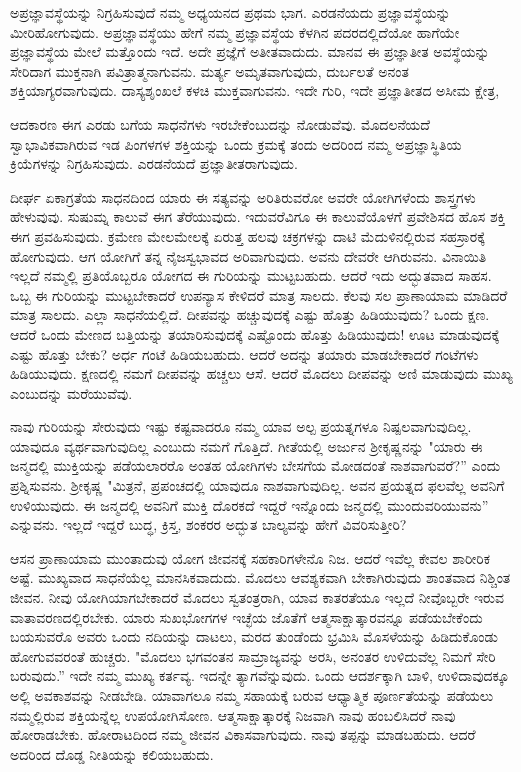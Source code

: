 ಅಪ್ರಜ್ಞಾವಸ್ಥೆಯನ್ನು ನಿಗ್ರಹಿಸುವುದೆ ನಮ್ಮ ಅಧ್ಯಯನದ ಪ್ರಥಮ ಭಾಗ. ಎರಡನೆಯದು ಪ್ರಜ್ಞಾವಸ್ಥೆಯನ್ನು ಮೀರಿಹೋಗುವುದು. ಅಪ್ರಜ್ಞಾವಸ್ಥೆಯು ಹೇಗೆ ನಮ್ಮ ಪ್ರಜ್ಞಾವಸ್ಥೆಯ ಕೆಳಗಿನ ಪದರದಲ್ಲಿದೆಯೋ ಹಾಗೆಯೇ ಪ್ರಜ್ಞಾವಸ್ಥೆಯ ಮೇಲೆ ಮತ್ತೊಂದು ಇದೆ. ಅದೇ ಪ್ರಜ್ಞೆಗೆ ಅತೀತವಾದುದು. ಮಾನವ ಈ ಪ್ರಜ್ಞಾತೀತ ಅವಸ್ಥೆಯನ್ನು ಸೇರಿದಾಗ ಮುಕ್ತನಾಗಿ ಪವಿತ್ರಾತ್ಮನಾಗುವನು. ಮರ್ತ್ಯ ಅಮೃತವಾಗುವುದು, ದುರ್ಬಲತೆ ಅನಂತ ಶಕ್ತಿಯಾಗ್ಯರವಾಗುವುದು. ದಾಸ್ಯಶೃಂಖಲೆ ಕಳಚಿ ಮುಕ್ತವಾಗುವನು. ಇದೇ ಗುರಿ, ಇದೇ ಪ್ರಜ್ಞಾತೀತದ ಅಸೀಮ ಕ್ಷೇತ್ರ,

ಆದಕಾರಣ ಈಗ ಎರಡು ಬಗೆಯ ಸಾಧನೆಗಳು ಇರಬೇಕೆಂಬುದನ್ನು ನೋಡುವೆವು. ಮೊದಲನೆಯದೆ ಸ್ವಾಭಾವಿಕವಾಗಿರುವ ಇಡ ಪಿಂಗಳಗಳ ಶಕ್ತಿಯನ್ನು ಒಂದು ಕ್ರಮಕ್ಕೆ ತಂದು ಅದರಿಂದ ನಮ್ಮ ಅಪ್ರಜ್ಞಾಸ್ಥಿತಿಯ ಕ್ರಿಯೆಗಳನ್ನು ನಿಗ್ರಹಿಸುವುದು. ಎರಡನೆಯದೆ ಪ್ರಜ್ಞಾತೀತರಾಗುವುದು.

ದೀರ್ಘ ಏಕಾಗ್ರತೆಯ ಸಾಧನದಿಂದ ಯಾರು ಈ ಸತ್ಯವನ್ನು ಅರಿತಿರುವರೋ ಅವರೇ ಯೋಗಿಗಳೆಂದು ಶಾಸ್ತ್ರಗಳು ಹೇಳುವುವು. ಸುಷುಮ್ನ ಕಾಲುವೆ ಈಗ ತೆರೆಯುವುದು. ಇದುವರೆವಿಗೂ ಈ ಕಾಲುವೆಯೊಳಗೆ ಪ್ರವೇಶಿಸದ ಹೊಸ ಶಕ್ತಿ ಈಗ ಪ್ರವಹಿಸುವುದು. ಕ್ರಮೇಣ ಮೇಲಮೇಲಕ್ಕೆ ಏರುತ್ತ ಹಲವು ಚಕ್ರಗಳನ್ನು ದಾಟಿ ಮೆದುಳಿನಲ್ಲಿರುವ ಸಹಸ್ರಾರಕ್ಕೆ ಹೋಗುವುದು. ಆಗ ಯೋಗಿಗೆ ತನ್ನ ನೈಜಸ್ವಭಾವದ ಅರಿವಾಗುವುದು. ಅವನು ದೇವರೇ ಆಗಿರುವನು. ವಿನಾಯಿತಿ ಇಲ್ಲದೆ ನಮ್ಮಲ್ಲಿ ಪ್ರತಿಯೊಬ್ಬರೂ ಯೋಗದ ಈ ಗುರಿಯನ್ನು ಮುಟ್ಟಬಹುದು. ಆದರೆ ಇದು ಅದ್ಭುತವಾದ ಸಾಹಸ. ಒಬ್ಬ ಈ ಗುರಿಯನ್ನು ಮುಟ್ಟಬೇಕಾದರೆ ಉಪನ್ಯಾಸ ಕೇಳಿದರೆ ಮಾತ್ರ ಸಾಲದು. ಕೆಲವು ಸಲ ಪ್ರಾಣಾಯಾಮ ಮಾಡಿದರೆ ಮಾತ್ರ ಸಾಲದು. ಎಲ್ಲಾ ಸಾಧನೆಯಲ್ಲಿದೆ. ದೀಪವನ್ನು ಹಚ್ಚುವುದಕ್ಕೆ ಎಷ್ಟು ಹೊತ್ತು ಹಿಡಿಯುವುದು? ಒಂದು ಕ್ಷಣ. ಆದರೆ ಒಂದು ಮೇಣದ ಬತ್ತಿಯನ್ನು ತಯಾರಿಸುವುದಕ್ಕೆ ಎಷ್ಟೊಂದು ಹೊತ್ತು ಹಿಡಿಯುವುದು! ಊಟ ಮಾಡುವುದಕ್ಕೆ ಎಷ್ಟು ಹೊತ್ತು ಬೇಕು? ಅರ್ಧ ಗಂಟೆ ಹಿಡಿಯಬಹುದು. ಆದರೆ ಅದನ್ನು ತಯಾರು ಮಾಡಬೇಕಾದರೆ ಗಂಟೆಗಳು ಹಿಡಿಯುವುದು. ಕ್ಷಣದಲ್ಲಿ ನಮಗೆ ದೀಪವನ್ನು ಹಚ್ಚಲು ಆಸೆ. ಆದರೆ ಮೊದಲು ದೀಪವನ್ನು ಅಣಿ ಮಾಡುವುದು ಮುಖ್ಯ ಎಂಬುದನ್ನು ಮರೆಯುವೆವು.

ನಾವು ಗುರಿಯನ್ನು ಸೇರುವುದು ಇಷ್ಟು ಕಷ್ಟವಾದರೂ ನಮ್ಮ ಯಾವ ಅಲ್ಪ ಪ್ರಯತ್ನಗಳೂ ನಿಷ್ಪಲವಾಗುವುದಿಲ್ಲ. ಯಾವುದೂ ವ್ಯರ್ಥವಾಗುವುದಿಲ್ಲ ಎಂಬುದು ನಮಗೆ ಗೊತ್ತಿದೆ. ಗೀತೆಯಲ್ಲಿ ಅರ್ಜುನ ಶ‍್ರೀಕೃಷ್ಣನನ್ನು "ಯಾರು ಈ ಜನ್ಮದಲ್ಲಿ ಮುಕ್ತಿಯನ್ನು ಪಡೆಯಲಾರರೊ ಅಂತಹ ಯೋಗಿಗಳು ಬೇಸಗೆಯ ಮೋಡದಂತೆ ನಾಶವಾಗುವರೆ?'' ಎಂದು ಪ್ರಶ್ನಿಸುವನು. ಶ‍್ರೀಕೃಷ್ಣ "ಮಿತ್ರನೆ, ಪ್ರಪಂಚದಲ್ಲಿ ಯಾವುದೂ ನಾಶವಾಗುವುದಿಲ್ಲ. ಅವನ ಪ್ರಯತ್ನದ ಫಲವೆಲ್ಲ ಅವನಿಗೆ ಉಳಿಯುವುದು. ಈ ಜನ್ಮದಲ್ಲಿ ಅವನಿಗೆ ಮುಕ್ತಿ ದೊರಕದೆ ಇದ್ದರೆ ಇನ್ನೊಂದು ಜನ್ಮದಲ್ಲಿ ಮುಂದುವರಿಯುವನು” ಎನ್ನುವನು. ಇಲ್ಲದೆ ಇದ್ದರೆ ಬುದ್ಧ, ಕ್ರಿಸ್ತ, ಶಂಕರರ ಅದ್ಭುತ ಬಾಲ್ಯವನ್ನು ಹೇಗೆ ವಿವರಿಸುತ್ತೀರಿ?

ಆಸನ ಪ್ರಾಣಾಯಾಮ ಮುಂತಾದುವು ಯೋಗ ಜೀವನಕ್ಕೆ ಸಹಕಾರಿಗಳೇನೊ ನಿಜ. ಆದರೆ ಇವೆಲ್ಲ ಕೇವಲ ಶಾರೀರಿಕ ಅಷ್ಟೆ. ಮುಖ್ಯವಾದ ಸಾಧನೆಯೆಲ್ಲ ಮಾನಸಿಕವಾದುದು. ಮೊದಲು ಆವಶ್ಯಕವಾಗಿ ಬೇಕಾಗಿರುವುದು ಶಾಂತವಾದ ನಿಶ್ಚಿಂತ ಜೀವನ. ನೀವು ಯೋಗಿಯಾಗಬೇಕಾದರೆ ಮೊದಲು ಸ್ವತಂತ್ರರಾಗಿ, ಯಾವ ಕಾತರತೆಯೂ ಇಲ್ಲದೆ ನೀವೊಬ್ಬರೇ ಇರುವ ವಾತಾವರಣದಲ್ಲಿರಬೇಕು. ಯಾರು ಸುಖಭೋಗಗಳ ಇಚ್ಛೆಯ ಜೊತೆಗೆ ಆತ್ಮಸಾಕ್ಷಾತ್ಕಾರವನ್ನೂ ಪಡೆಯಬೇಕೆಂದು ಬಯಸುವರೊ ಅವರು ಒಂದು ನದಿಯನ್ನು ದಾಟಲು, ಮರದ ತುಂಡೆಂದು ಭ್ರಮಿಸಿ ಮೊಸಳೆಯನ್ನು ಹಿಡಿದುಕೊಂಡು ಹೋಗುವವರಂತೆ ಹುಚ್ಚರು. "ಮೊದಲು ಭಗವಂತನ ಸಾಮ್ರಾಜ್ಯವನ್ನು ಅರಸಿ, ಅನಂತರ ಉಳಿದುವೆಲ್ಲ ನಿಮಗೆ ಸೇರಿ ಬರುವುದು.'' ಇದೇ ನಮ್ಮ ಮುಖ್ಯ ಕರ್ತವ್ಯ. ಇದನ್ನೇ ತ್ಯಾಗವೆನ್ನುವುದು. ಒಂದು ಆದರ್ಶಕ್ಕಾಗಿ ಬಾಳಿ, ಉಳಿದಾವುದಕ್ಕೂ ಅಲ್ಲಿ ಅವಕಾಶವನ್ನು ನೀಡಬೇಡಿ. ಯಾವಾಗಲೂ ನಮ್ಮ ಸಹಾಯಕ್ಕೆ ಬರುವ ಆಧ್ಯಾತ್ಮಿಕ ಪೂರ್ಣತೆಯನ್ನು ಪಡೆಯಲು ನಮ್ಮಲ್ಲಿರುವ ಶಕ್ತಿಯನ್ನೆಲ್ಲ ಉಪಯೋಗಿಸೋಣ. ಆತ್ಮಸಾಕ್ಷಾತ್ಕಾರಕ್ಕೆ ನಿಜವಾಗಿ ನಾವು ಹಂಬಲಿಸಿದರೆ ನಾವು ಹೋರಾಡಬೇಕು. ಹೋರಾಟದಿಂದ ನಮ್ಮ ಜೀವನ ವಿಕಾಸವಾಗುವುದು. ನಾವು ತಪ್ಪನ್ನು ಮಾಡಬಹುದು. ಆದರೆ ಅದರಿಂದ ದೊಡ್ಡ ನೀತಿಯನ್ನು ಕಲಿಯಬಹುದು.

